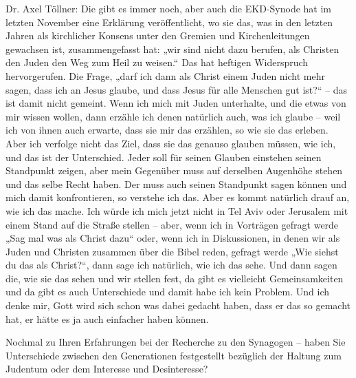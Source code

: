  
Dr. Axel Töllner: Die gibt es immer noch, aber auch die EKD-Synode hat im letzten November eine Erklärung veröffentlicht, wo sie das, was in den letzten Jahren als kirchlicher Konsens unter den Gremien und Kirchenleitungen gewachsen ist, zusammengefasst hat: „wir sind nicht dazu berufen, als Christen den Juden den Weg zum Heil zu weisen.“ Das hat heftigen Widerspruch hervorgerufen. Die Frage, „darf ich dann als Christ einem Juden nicht mehr sagen, dass ich an Jesus glaube, und dass Jesus für alle Menschen gut ist?“ – das ist damit nicht gemeint. Wenn ich mich mit Juden unterhalte, und die etwas von mir wissen wollen, dann erzähle ich denen natürlich auch, was ich glaube – weil ich von ihnen auch erwarte, dass sie mir das erzählen, so wie sie das erleben. Aber ich verfolge nicht das Ziel, dass sie das genauso glauben müssen, wie ich, und das ist der Unterschied. Jeder soll für seinen Glauben einstehen seinen Standpunkt zeigen, aber mein Gegenüber muss auf derselben Augenhöhe stehen und das selbe Recht haben. Der muss auch seinen Standpunkt sagen können und mich damit konfrontieren, so verstehe ich das.  
Aber es kommt natürlich drauf an, wie ich das mache. Ich würde ich mich jetzt nicht in Tel Aviv oder Jerusalem mit einem Stand auf die Straße stellen – aber, wenn ich in Vorträgen gefragt werde „Sag mal was als Christ dazu“ oder, wenn ich in Diskussionen, in denen wir als Juden und Christen zusammen über die Bibel reden, gefragt werde „Wie siehst du das als Christ?“, dann sage ich natürlich, wie ich das sehe. Und dann sagen die, wie sie das sehen und wir stellen fest, da gibt es vielleicht Gemeinsamkeiten und da gibt es auch Unterschiede und damit habe ich kein Problem. Und ich denke mir, Gott wird sich schon was dabei gedacht haben, dass er das so gemacht hat, er hätte es ja auch einfacher haben können.  

 
Nochmal zu Ihren Erfahrungen bei der Recherche zu den Synagogen – haben Sie Unterschiede zwischen den Generationen festgestellt bezüglich der Haltung zum Judentum oder dem Interesse und Desinteresse? 


